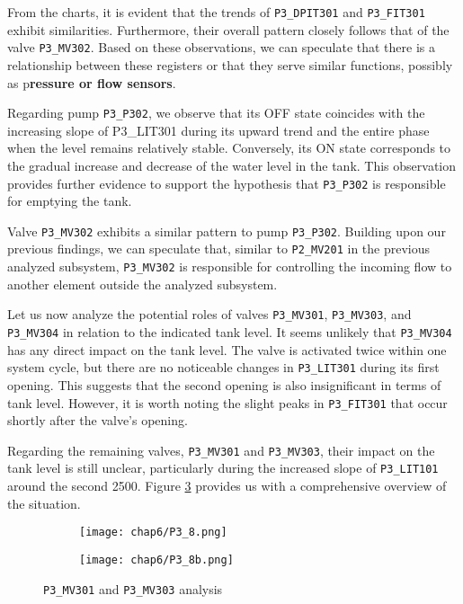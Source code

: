 From the charts, it is evident that the trends of \texttt{P3\_DPIT301} and \texttt{P3\_FIT301} exhibit similarities. Furthermore, their overall pattern closely follows that of the valve \texttt{P3\_MV302}. Based on these observations, we can speculate that there is a relationship between these registers or that they serve similar functions, possibly as p\textbf{ressure or flow sensors}.

\bigskip
Regarding pump \texttt{P3\_P302}, we observe that its OFF state coincides with the increasing slope of P3\_LIT301 during its upward trend and the entire phase when the level remains relatively stable. Conversely, its ON state corresponds to the gradual increase and decrease of the water level in the tank. This observation provides further evidence to support the hypothesis that \texttt{P3\_P302} is responsible for emptying the tank.

Valve \texttt{P3\_MV302} exhibits a similar pattern to pump \texttt{P3\_P302}. Building upon our previous findings, we can speculate that, similar to \texttt{P2\_MV201} in the previous analyzed subsystem, \texttt{P3\_MV302} is responsible for controlling the incoming flow to another element outside the analyzed subsystem.

\bigskip
Let us now analyze the potential roles of valves \texttt{P3\_MV301}, \texttt{P3\_MV303}, and \texttt{P3\_MV304} in relation to the indicated tank level. It seems unlikely that \texttt{P3\_MV304} has any direct impact on the tank level. The valve is activated twice within one system cycle, but there are no noticeable changes in \texttt{P3\_LIT301} during its first opening. This suggests that the second opening is also insignificant in terms of tank level. However, it is worth noting the slight peaks in \texttt{P3\_FIT301} that occur shortly after the valve's opening.

Regarding the remaining valves, \texttt{P3\_MV301} and \texttt{P3\_MV303}, their impact on the tank level is still unclear, particularly during the increased slope of \texttt{P3\_LIT101} around the second 2500. Figure \ref{fig:6_graphs_P3_zoom}  provides us with a comprehensive overview of the situation.

\begin{figure}[H]
	\centering
	\begin{subfigure}{0.90\textwidth}
		\texttt{[image: chap6/P3\_8.png]}
		\caption{}
		\label{subfig:6_mv301}
	\end{subfigure}
	\begin{subfigure}{0.90\textwidth}
		\texttt{[image: chap6/P3\_8b.png]}
		\caption{}
		\label{subfig:6_mv301_zoom}
	\end{subfigure}
	\caption{\texttt{P3\_MV301} and \texttt{P3\_MV303} analysis}
	\label{fig:6_graphs_P3_zoom}
\end{figure}

